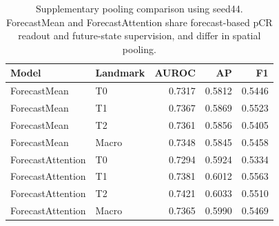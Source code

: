 \begin{table}[t]
\centering
\caption{Supplementary pooling comparison using seed44. ForecastMean and ForecastAttention share forecast-based pCR readout and future-state supervision, and differ in spatial pooling.}
\label{tab:pooling}
\begin{tabular}{llrrr}
\toprule
Model & Landmark & AUROC & AP & F1 \\
\midrule
ForecastMean & T0 & 0.7317 & 0.5812 & 0.5446 \\
ForecastMean & T1 & 0.7367 & 0.5869 & 0.5523 \\
ForecastMean & T2 & 0.7361 & 0.5856 & 0.5405 \\
ForecastMean & Macro & 0.7348 & 0.5845 & 0.5458 \\
\midrule
ForecastAttention & T0 & 0.7294 & 0.5924 & 0.5334 \\
ForecastAttention & T1 & 0.7381 & 0.6012 & 0.5563 \\
ForecastAttention & T2 & 0.7421 & 0.6033 & 0.5510 \\
ForecastAttention & Macro & 0.7365 & 0.5990 & 0.5469 \\
\bottomrule
\end{tabular}
\end{table}
